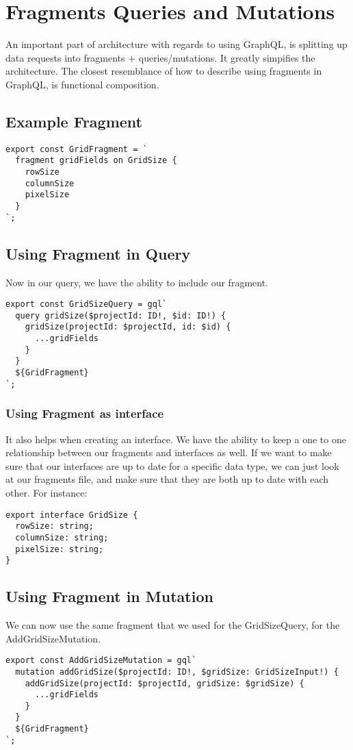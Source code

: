 
\chapter{ Fragments Queries and Mutations }

An important part of architecture with regards to using GraphQL, is splitting
up data requests into fragments + queries/mutations. It greatly simpifies
the architecture. The closest resemblance of how to describe using fragments
in GraphQL, is functional composition.



\section{ Example Fragment }
\begin{verbatim}
export const GridFragment = `
  fragment gridFields on GridSize {
    rowSize
    columnSize
    pixelSize
  }
`;
\end{verbatim}

\section{ Using Fragment in Query }
Now in our query, we have the ability to include our fragment.
\begin{verbatim}
export const GridSizeQuery = gql`
  query gridSize($projectId: ID!, $id: ID!) {
    gridSize(projectId: $projectId, id: $id) {
      ...gridFields
    }
  }
  ${GridFragment}
`;
\end{verbatim}

\subsection{ Using Fragment as interface }
It also helps when creating an interface. We have the ability to keep a one to
one relationship between our fragments and interfaces as well. If we want to
make sure that our interfaces are up to date for a specific data type, we can
just look at our fragments file, and make sure that they are both up to date
with each other. For instance:
\begin{lstlisting}
export interface GridSize {
  rowSize: string;
  columnSize: string;
  pixelSize: string;
}
\end{lstlisting}

\section{ Using Fragment in Mutation }
We can now use the same fragment that we used for the GridSizeQuery, for the
AddGridSizeMutation.

\begin{lstlisting}
export const AddGridSizeMutation = gql`
  mutation addGridSize($projectId: ID!, $gridSize: GridSizeInput!) {
    addGridSize(projectId: $projectId, gridSize: $gridSize) {
      ...gridFields
    }
  }
  ${GridFragment}
`;
\end{lstlisting}
